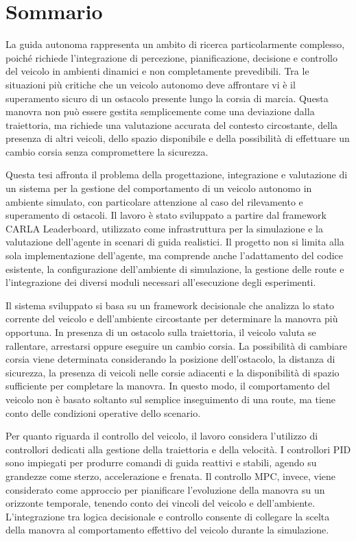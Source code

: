 \chapter*{Sommario}

La guida autonoma rappresenta un ambito di ricerca particolarmente complesso, poiché richiede l'integrazione di percezione, pianificazione, decisione e controllo del veicolo in ambienti dinamici e non completamente prevedibili. Tra le situazioni più critiche che un veicolo autonomo deve affrontare vi è il superamento sicuro di un ostacolo presente lungo la corsia di marcia. Questa manovra non può essere gestita semplicemente come una deviazione dalla traiettoria, ma richiede una valutazione accurata del contesto circostante, della presenza di altri veicoli, dello spazio disponibile e della possibilità di effettuare un cambio corsia senza compromettere la sicurezza.

Questa tesi affronta il problema della progettazione, integrazione e valutazione di un sistema per la gestione del comportamento di un veicolo autonomo in ambiente simulato, con particolare attenzione al caso del rilevamento e superamento di ostacoli. Il lavoro è stato sviluppato a partire dal framework CARLA Leaderboard, utilizzato come infrastruttura per la simulazione e la valutazione dell'agente in scenari di guida realistici. Il progetto non si limita alla sola implementazione dell'agente, ma comprende anche l'adattamento del codice esistente, la configurazione dell'ambiente di simulazione, la gestione delle route e l'integrazione dei diversi moduli necessari all'esecuzione degli esperimenti.

Il sistema sviluppato si basa su un framework decisionale che analizza lo stato corrente del veicolo e dell'ambiente circostante per determinare la manovra più opportuna. In presenza di un ostacolo sulla traiettoria, il veicolo valuta se rallentare, arrestarsi oppure eseguire un cambio corsia. La possibilità di cambiare corsia viene determinata considerando la posizione dell'ostacolo, la distanza di sicurezza, la presenza di veicoli nelle corsie adiacenti e la disponibilità di spazio sufficiente per completare la manovra. In questo modo, il comportamento del veicolo non è basato soltanto sul semplice inseguimento di una route, ma tiene conto delle condizioni operative dello scenario.

Per quanto riguarda il controllo del veicolo, il lavoro considera l'utilizzo di controllori dedicati alla gestione della traiettoria e della velocità. I controllori PID sono impiegati per produrre comandi di guida reattivi e stabili, agendo su grandezze come sterzo, accelerazione e frenata. Il controllo MPC, invece, viene considerato come approccio per pianificare l'evoluzione della manovra su un orizzonte temporale, tenendo conto dei vincoli del veicolo e dell'ambiente. L'integrazione tra logica decisionale e controllo consente di collegare la scelta della manovra al comportamento effettivo del veicolo durante la simulazione.


